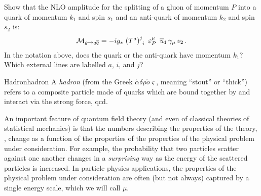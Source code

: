 \begin{exercise}
    \label{ex:gtoqq-amplitude}
    Show that the NLO amplitude for the splitting of a gluon of momentum \(P\) into a quark of momentum \(k_1\) and spin \(s_1\) and an anti-quark of momentum \(k_2\) and spin \(s_2\) is:
    \begin{align}
        \mathcal{M}_{g \to q \overline{q}}
        =
        -ig_s
        \,
        \le(T^a\ri)\indices{^j_i}
        \,\,
        \varepsilon_P^\mu
        \,\,\,
        \overline{u}_1 \, \gamma_\mu \, v_2
        \,.
    \end{align}
    In the notation above, does the quark or the anti-quark have momentum \(k_1\)?
    Which external lines are labelled \(a\), \(i\), and \(j\)?
\end{exercise}





\begin{definitionbox}{Hadron}{hadron}
    A \emph{\gls{hadron}} (from the Greek \(\acute{\alpha}\delta \rho \acute{o}\varsigma\), meaning ``stout'' or ``thick'') refers to a composite particle made of quarks which are bound together by and interact via the strong force, \gls{qcd}.
\end{definitionbox}


An important feature of quantum field theory (and even of classical theories of statistical mechanics) is that the numbers describing the properties of the theory, , change as a function of the properties of the properties of the physical problem under consideration.
%
For example, the probability that two particles scatter against one another changes in a \emph{surprising} way as the energy of the scattered particles is increased.
%
In particle physics applications, the properties of the physical problem under consideration are often (but not always) captured by a single energy scale, which we will call \(\mu\).

